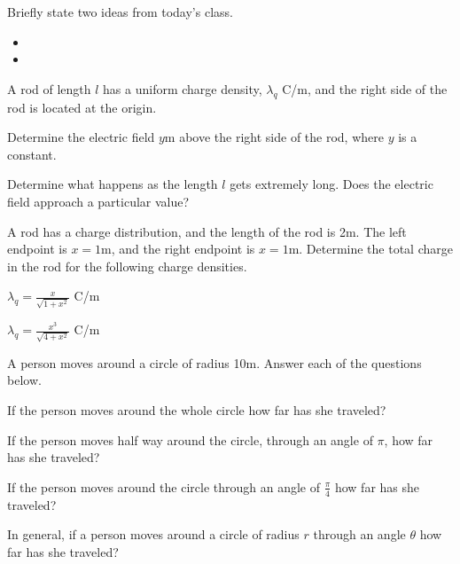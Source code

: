\begin{problem}
\item Briefly state two ideas from today's class.
  \begin{itemize}
  \item
  \item
  \end{itemize}
\item A rod of length $l$ has a uniform charge density, $\lambda_q$ C/m,
    and the right side of the rod is located at the origin.
    \begin{subproblem}
      \item Determine the electric field $y$m above the right side of the rod,
        where $y$ is a constant.
      \item Determine what happens as the length $l$ gets extremely long.
        Does the electric field approach a particular value?
    \end{subproblem}
\item A rod has a charge distribution, and the length of the rod is
  2m. The left endpoint is $x=1$m, and the right endpoint is
  $x=1$m. Determine the total charge in the rod for the following
  charge densities.
  \begin{subproblem}
    \item $\lambda_q = \frac{x}{\sqrt{1+x^2}}$ C/m
      \vfill
    \item $\lambda_q = \frac{x^3}{\sqrt{4+x^2}}$ C/m
      \vfill
  \end{subproblem}
\end{problem}



\begin{problem}
\item A person moves around a circle of radius 10m. Answer each of the questions below.
  \begin{subproblem}
  \item If the person moves around the whole circle how far has she traveled?
    \vfill
  \item If the person moves half way around the circle, through an angle of $\pi$, how far has she traveled?
    \vfill
  \item If the person moves around the circle through an angle of $\frac{\pi}{4}$ how far has she traveled?
    \vfill
  \item In general, if a person moves around a circle of radius $r$ through an angle $\theta$ how far has she traveled?
      \vfill
  \end{subproblem}
\end{problem}



